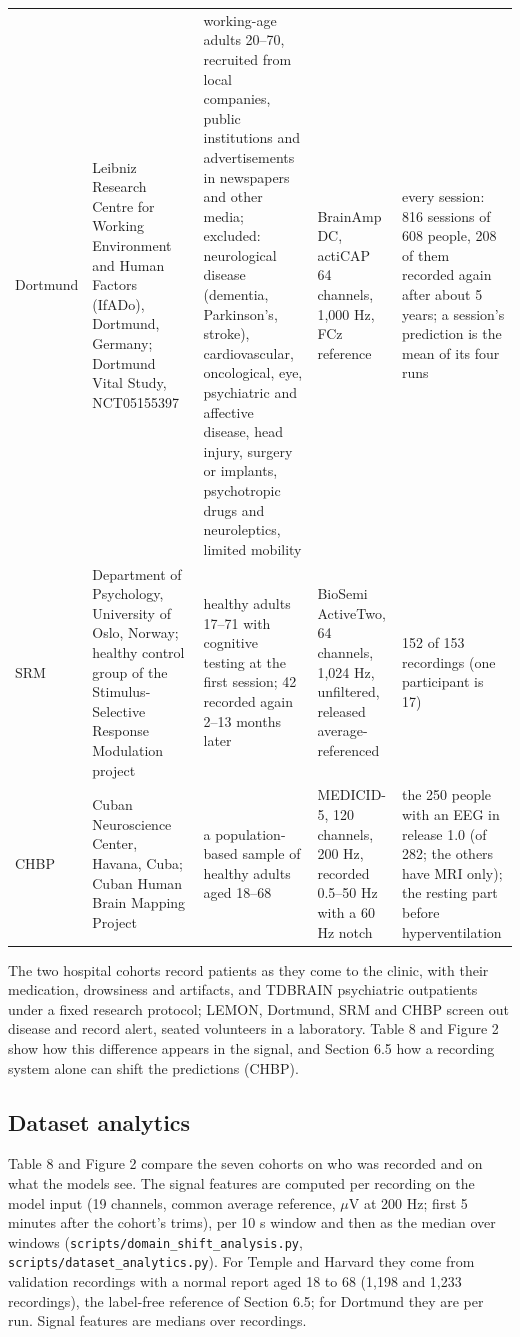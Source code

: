 \documentclass[11pt,a4paper]{article}
\begin{document}
\begin{table}[t]
{\begin{tabular}{lllll}
Dortmund & Leibniz Research Centre for Working Environment and Human Factors (IfADo), Dortmund, Germany; Dortmund Vital Study, NCT05155397~\citep{wascher2025dortmund,gajewski2022dortmund} & working-age adults 20--70, recruited from local companies, public institutions and advertisements in newspapers and other media; excluded: neurological disease (dementia, Parkinson's, stroke), cardiovascular, oncological, eye, psychiatric and affective disease, head injury, surgery or implants, psychotropic drugs and neuroleptics, limited mobility & BrainAmp DC, actiCAP 64 channels, 1,000 Hz, FCz reference & every session: 816 sessions of 608 people, 208 of them recorded again after about 5 years; a session's prediction is the mean of its four runs \\
SRM & Department of Psychology, University of Oslo, Norway; healthy control group of the Stimulus-Selective Response Modulation project~\citep{hatlestadhall2021srm} & healthy adults 17--71 with cognitive testing at the first session; 42 recorded again 2--13 months later & BioSemi ActiveTwo, 64 channels, 1,024 Hz, unfiltered, released average-referenced & 152 of 153 recordings (one participant is 17) \\
CHBP & Cuban Neuroscience Center, Havana, Cuba; Cuban Human Brain Mapping Project~\citep{valdessosa2021chbp} & a population-based sample of healthy adults aged 18--68 & MEDICID-5, 120 channels, 200 Hz, recorded 0.5--50 Hz with a 60 Hz notch & the 250 people with an EEG in release 1.0 (of 282; the others have MRI only); the resting part before hyperventilation \\
\bottomrule
\end{tabular}
}
\end{table}


The two hospital cohorts record patients as they come to the clinic, with their medication, drowsiness and artifacts, and TDBRAIN psychiatric outpatients under a fixed research protocol; LEMON, Dortmund, SRM and CHBP screen out disease and record alert, seated volunteers in a laboratory. Table 8 and Figure 2 show how this difference appears in the signal, and Section 6.5 how a recording system alone can shift the predictions (CHBP).

\subsection{Dataset analytics}

Table 8 and Figure 2 compare the seven cohorts on who was recorded and on what the models see. The signal features are computed per recording on the model input (19 channels, common average reference, $\mu$V at 200 Hz; first 5 minutes after the cohort's trims), per 10 s window and then as the median over windows (\texttt{scripts/domain\_shift\_analysis.py}, \texttt{scripts/dataset\_analytics.py}). For Temple and Harvard they come from validation recordings with a normal report aged 18 to 68 (1,198 and 1,233 recordings), the label-free reference of Section 6.5; for Dortmund they are per run. Signal features are medians over recordings.
\end{document}
